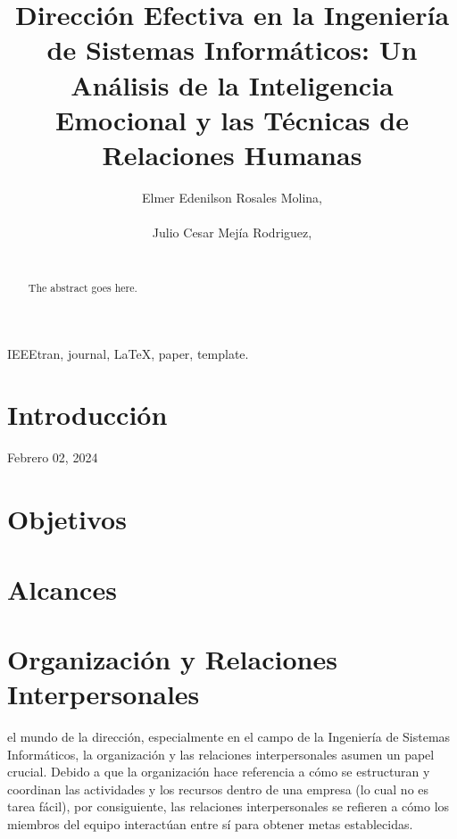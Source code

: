 \documentclass[journal]{IEEEtran}
\begin{document}
\title{Dirección Efectiva en la Ingeniería de Sistemas Informáticos: Un Análisis de la Inteligencia Emocional y las Técnicas de Relaciones Humanas}

\author{Elmer Edenilson Rosales Molina,\\ ~\\
        Julio Cesar Mejía Rodriguez,\\ ~}

\maketitle

\begin{abstract}
The abstract goes here.
\end{abstract}

\begin{keywords}
IEEEtran, journal, \LaTeX, paper, template.
\end{keywords}

\IEEEpeerreviewmaketitle

\section{Introducción}

 
\hfill Febrero 02, 2024

\section{Objetivos}

\section{Alcances}

\section{Organización y Relaciones Interpersonales}
 el mundo de la dirección, especialmente en el campo de la Ingeniería de Sistemas Informáticos, la organización y las relaciones interpersonales asumen un papel crucial. Debido a que la organización hace referencia a cómo se estructuran y coordinan las actividades y los recursos dentro de una empresa (lo cual no es tarea fácil), por consiguiente, las relaciones interpersonales se refieren a cómo los miembros del equipo interactúan entre sí para obtener metas establecidas.
\end{document}
